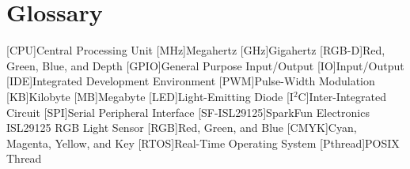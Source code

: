 \chapter*{Glossary}
\begin{acronym}
[CPU]{Central Processing Unit}
[MHz]{Megahertz} %
[GHz]{Gigahertz}
[RGB-D]{Red, Green, Blue, and Depth}
[GPIO]{General Purpose Input/Output}
[IO]{Input/Output}
[IDE]{Integrated Development Environment}
[PWM]{Pulse-Width Modulation}
[KB]{Kilobyte}
[MB]{Megabyte}
[LED]{Light-Emitting Diode}
[I$^2$C]{Inter-Integrated Circuit}
[SPI]{Serial Peripheral Interface}
[SF-ISL29125]{SparkFun Electronics ISL29125 RGB Light Sensor}
[RGB]{Red, Green, and Blue}
[CMYK]{Cyan, Magenta, Yellow, and Key}
[RTOS]{Real-Time Operating System}
[Pthread]{POSIX Thread}
\end{acronym}